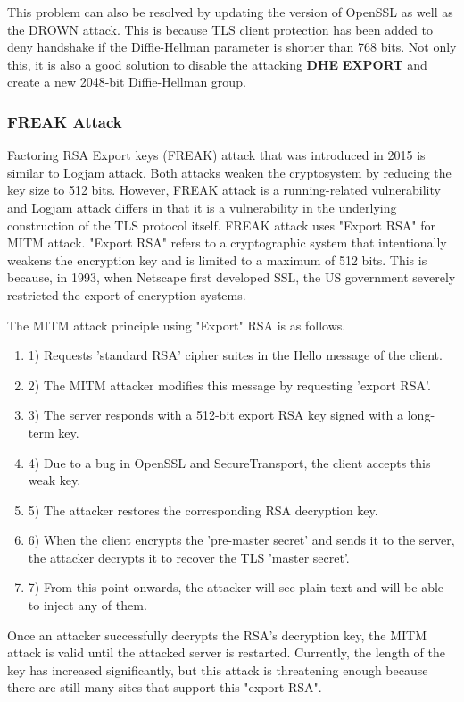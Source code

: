 \documentclass[a4paper]{article}
\begin{document}
This problem can also be resolved by updating the version of OpenSSL as well as the DROWN attack. This is because TLS client protection has been added to deny handshake if the Diffie-Hellman parameter is shorter than 768 bits. Not only this, it is also a good solution to disable the attacking \textbf{DHE$\_$EXPORT} and create a new 2048-bit Diffie-Hellman group.

\subsubsection*{FREAK Attack}
Factoring RSA Export keys (FREAK) attack that was introduced in 2015 is similar to Logjam attack. Both attacks weaken the cryptosystem by reducing the key size to 512 bits. However, FREAK attack is a running-related vulnerability and Logjam attack differs in that it is a vulnerability in the underlying construction of the TLS protocol itself. FREAK attack uses "Export RSA" for MITM attack. "Export RSA" refers to a cryptographic system that intentionally weakens the encryption key and is limited to a maximum of 512 bits. This is because, in 1993, when Netscape first developed SSL, the US government severely restricted the export of encryption systems.

The MITM attack principle using "Export" RSA is as follows. 
\begin{enumerate}[label=]
      \item 1) Requests 'standard RSA' cipher suites in the Hello message of the client.
      \item 2) The MITM attacker modifies this message by requesting 'export RSA'.
      \item 3) The server responds with a 512-bit export RSA key signed with a long-term key.
      \item 4) Due to a bug in OpenSSL and SecureTransport, the client accepts this weak key.
      \item 5) The attacker restores the corresponding RSA decryption key.
      \item 6) When the client encrypts the 'pre-master secret' and sends it to the server, the attacker decrypts it to recover the TLS 'master secret'.
      \item 7) From this point onwards, the attacker will see plain text and will be able to inject any of them.    
\end{enumerate}  

      
Once an attacker successfully decrypts the RSA's decryption key, the MITM attack is valid until the attacked server is restarted. Currently, the length of the key has increased significantly, but this attack is threatening enough because there are still many sites that support this "export RSA". 
\end{document}
